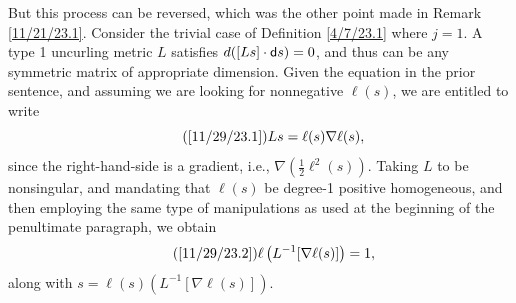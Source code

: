 \documentclass{amsart}
\numberwithin{equation}{section}
\theoremstyle{definition}
\numberwithin{theorem}{section}
\begin{document}
But this process can be reversed, which was the other point made in Remark \ref{11/21/23.1}.  Consider the trivial case of Definition \ref{4/7/23.1} where $j=1$.  A type 1 uncurling metric $L$ satisfies $d([Ls]\cdot {\sf d}s)=0$, and thus can be any symmetric matrix of appropriate dimension.  Given the equation in the prior sentence, and assuming we are looking for nonnegative $\ell(s)$, we are entitled to write \begin{equation}\tag{\ref{11/29/23.1}} Ls = \ell(s)\nabla\ell(s),\end{equation} since the right-hand-side is a gradient, i.e., $\nabla(\frac{1}{2}\ell^2(s))$.  
Taking $L$ to be nonsingular, and mandating that $\ell(s)$ be degree-1 positive homogeneous, and then employing the same type of manipulations as used at the beginning of the penultimate paragraph, we obtain \begin{equation}\tag{\ref{11/29/23.2}}\ell\left(L^{-1}[\nabla\ell(s)]\right) = 1,\end{equation} along with $ s = \ell(s)\left(L^{-1}[\nabla\ell(s)]\right)$.  
\end{document}
